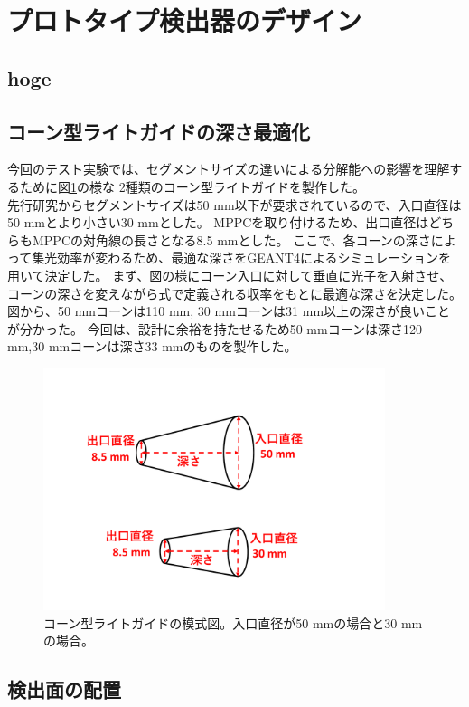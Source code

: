 \section{プロトタイプ検出器のデザイン}
\subsection{hoge}
\subsection{コーン型ライトガイドの深さ最適化}
今回のテスト実験では、セグメントサイズの違いによる分解能への影響を理解するために図\ref{cone}の様な
2種類のコーン型ライトガイドを製作した。\\
先行研究からセグメントサイズは50 mm以下が要求されているので、入口直径は50 mmとより小さい30 mmとした。
MPPCを取り付けるため、出口直径はどちらもMPPCの対角線の長さとなる8.5 mmとした。
ここで、各コーンの深さによって集光効率が変わるため、最適な深さをGEANT4によるシミュレーションを用いて決定した。
まず、図の様にコーン入口に対して垂直に光子を入射させ、コーンの深さを変えながら式で定義される収率をもとに最適な深さを決定した。
図から、50 mmコーンは110 mm, 30 mmコーンは31 mm以上の深さが良いことが分かった。
今回は、設計に余裕を持たせるため50 mmコーンは深さ120 mm,30 mmコーンは深さ33 mmのものを製作した。
\begin{figure}[htbp]
  \centering
  \includegraphics[width=10cm]{images/chapter3/cone.pdf}
  \caption{コーン型ライトガイドの模式図。入口直径が50 mmの場合と30 mmの場合。}
  \label{cone}
\end{figure}

\subsection{検出面の配置}